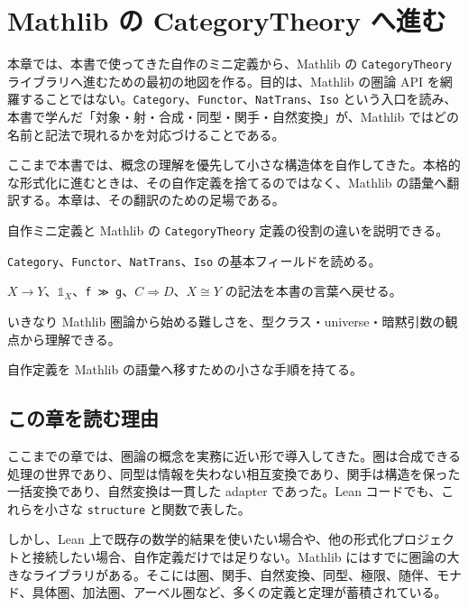 \chapter{Mathlib の CategoryTheory へ進む}
\label{chap:mathlib-category-theory}

\begin{chapterabstract}
本章では、本書で使ってきた自作のミニ定義から、Mathlib の \texttt{CategoryTheory} ライブラリへ進むための最初の地図を作る。目的は、Mathlib の圏論 API を網羅することではない。\texttt{Category}、\texttt{Functor}、\texttt{NatTrans}、\texttt{Iso} という入口を読み、本書で学んだ「対象・射・合成・同型・関手・自然変換」が、Mathlib ではどの名前と記法で現れるかを対応づけることである。

ここまで本書では、概念の理解を優先して小さな構造体を自作してきた。本格的な形式化に進むときは、その自作定義を捨てるのではなく、Mathlib の語彙へ翻訳する。本章は、その翻訳のための足場である。
\end{chapterabstract}

\begin{learninggoals}
\item 自作ミニ定義と Mathlib の \texttt{CategoryTheory} 定義の役割の違いを説明できる。
\item \texttt{Category}、\texttt{Functor}、\texttt{NatTrans}、\texttt{Iso} の基本フィールドを読める。
\item \(X \longrightarrow Y\)、\(\mathbb{1}_X\)、\texttt{f ≫ g}、\(C \Rightarrow D\)、\(X \cong Y\) の記法を本書の言葉へ戻せる。
\item いきなり Mathlib 圏論から始める難しさを、型クラス・universe・暗黙引数の観点から理解できる。
\item 自作定義を Mathlib の語彙へ移すための小さな手順を持てる。
\end{learninggoals}

\section{この章を読む理由}

ここまでの章では、圏論の概念を実務に近い形で導入してきた。圏は合成できる処理の世界であり、同型は情報を失わない相互変換であり、関手は構造を保った一括変換であり、自然変換は一貫した adapter であった。Lean コードでも、これらを小さな \texttt{structure} と関数で表した。

しかし、Lean 上で既存の数学的結果を使いたい場合や、他の形式化プロジェクトと接続したい場合、自作定義だけでは足りない。Mathlib にはすでに圏論の大きなライブラリがある。そこには圏、関手、自然変換、同型、極限、随伴、モナド、具体圏、加法圏、アーベル圏など、多くの定義と定理が蓄積されている。

